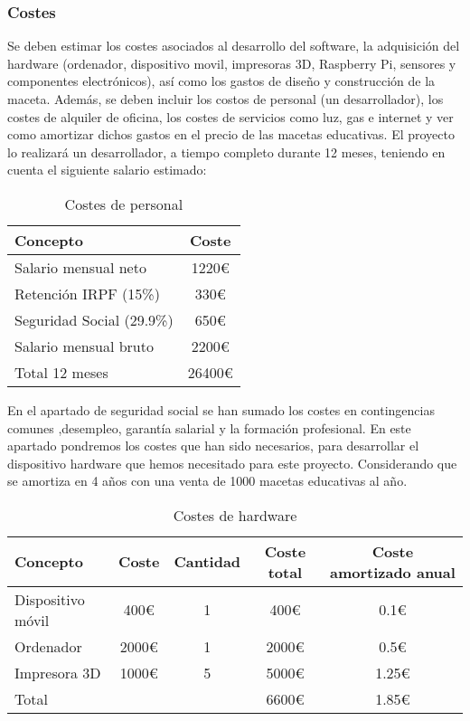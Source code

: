         \subsubsection{Costes}
        Se deben estimar los costes asociados al desarrollo del software, la adquisición del hardware (ordenador, dispositivo movil, impresoras 3D, Raspberry Pi, sensores y componentes electrónicos), así como los gastos de diseño y construcción de la maceta. Además, se deben incluir los costos de personal (un desarrollador), los costes de alquiler de oficina, los costes de servicios como luz, gas e internet y ver como amortizar dichos gastos en el precio de las macetas educativas.
            El proyecto lo realizará un desarrollador, a tiempo completo durante 12 meses, teniendo en cuenta el siguiente salario estimado:
            \begin{table}[H]
                \centering
                \caption{Costes de personal}
                \begin{tabular}{|l|c|}
                    \hline
                    Concepto & Coste \\
                    \hline
                    Salario mensual neto & 1220€ \\
                    Retención IRPF (15\%) & 330€ \\
                    Seguridad Social (29.9\%) & 650€ \\
                    \hline
                    Salario mensual bruto & 2200€ \\
                    \hline
                    Total 12 meses & 26400€ \\
                    \hline
                \end{tabular}
            \end{table}
            En el apartado de seguridad social se han sumado los costes en contingencias comunes ,desempleo, garantía salarial y la formación profesional.
            En este apartado pondremos los costes que han sido necesarios, para desarrollar el dispositivo hardware que hemos necesitado para este proyecto. Considerando que se amortiza en 4 años con una venta de 1000 macetas educativas al año.
            \begin{table}[H]
                \centering
                \caption{Costes de hardware}
                \begin{tabular}{|l|c|c|c|c|}
                    \hline
                    Concepto & Coste & Cantidad & Coste total & Coste amortizado anual \\
                    \hline
                    Dispositivo móvil & 400€ & 1 & 400€ & 0.1€ \\
                    Ordenador & 2000€ & 1 & 2000€ & 0.5€ \\
                    Impresora 3D & 1000€ & 5 & 5000€ & 1.25€ \\
                    \hline
                    Total & & & 6600€ & 1.85€ \\
                    \hline
                \end{tabular}
            \end{table}
